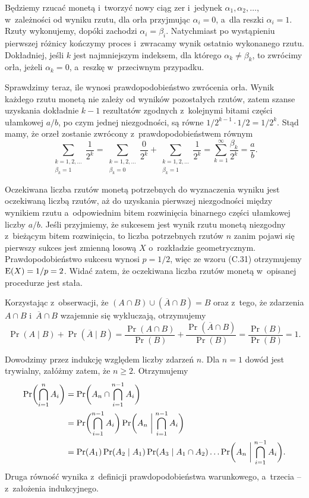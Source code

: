 Będziemy rzucać monetą i~tworzyć nowy ciąg zer i~jedynek $\alpha_1,\alpha_2,\dots$, w~zależności od wyniku  rzutu, dla orła przyjmując $\alpha_i=0$, a~dla reszki $\alpha_i=1$.
Rzuty wykonujemy, dopóki zachodzi $\alpha_i=\beta_i$.
Natychmiast po wystąpieniu pierwszej różnicy kończymy proces i~zwracamy wynik ostatnio wykonanego rzutu.
Dokładniej, jeśli $k$ jest najmniejszym indeksem, dla którego $\alpha_k\ne\beta_k$, to zwrócimy orła, jeżeli $\alpha_k=0$, a~reszkę w~przeciwnym przypadku.

Sprawdzimy teraz, ile wynosi prawdopodobieństwo zwrócenia orła.
Wynik każdego rzutu monetą nie zależy od wyników pozostałych rzutów, zatem szanse uzyskania dokładnie $k-1$ rezultatów zgodnych z~kolejnymi bitami części ułamkowej $a/b$, po czym jednej niezgodności, są równe $1/2^{k-1}\cdot1/2=1/2^k$.
Stąd mamy, że orzeł zostanie zwrócony z~prawdopodobieństwem równym
\[
    \sum_{\substack{k=1,2,\dots\\\beta_k=1}}\!\frac{1}{2^k} = \sum_{\substack{k=1,2,\dots\\\beta_k=0}}\!\frac{0}{2^k}+\sum_{\substack{k=1,2,\dots\\\beta_k=1}}\!\frac{1}{2^k} = \sum_{k=1}^\infty\frac{\beta_k}{2^k} = \frac{a}{b}.
\]

Oczekiwana liczba rzutów monetą potrzebnych do wyznaczenia wyniku jest oczekiwaną liczbą rzutów, aż do uzyskania pierwszej niezgodności między wynikiem rzutu a~odpowiednim bitem rozwinięcia binarnego części ułamkowej liczby $a/b$.
Jeśli przyjmiemy, że sukcesem jest wynik rzutu monetą niezgodny z~bieżącym bitem rozwinięcia, to liczba potrzebnych rzutów $n$ zanim pojawi się pierwszy sukces jest zmienną losową $X$ o~rozkładzie geometrycznym.
Prawdopodobieństwo sukcesu wynosi $p=1/2$, więc ze wzoru (C.31) otrzymujemy $\operatorname{E}(X)=1/p=2$.
Widać zatem, że oczekiwana liczba rzutów monetą w~opisanej procedurze jest stała.

\exercise %
Korzystając z~obserwacji, że $(A\cap B)\cup(\overline{A}\cap B)=B$ oraz z~tego, że zdarzenia $A\cap B$ i~$\overline{A}\cap B$ wzajemnie się wykluczają, otrzymujemy
\[
	\Pr(A\mid B)+\Pr(\overline{A}\mid B) = \frac{\Pr(A\cap B)}{\Pr(B)}+\frac{\Pr(\overline{A}\cap B)}{\Pr(B)} = \frac{\Pr(B)}{\Pr(B)} = 1.
\]

\exercise %
Dowodzimy przez indukcję względem liczby zdarzeń $n$.
Dla $n=1$ dowód jest trywialny, załóżmy zatem, że $n\ge2$.
Otrzymujemy
\begin{align*}
	\Pr\biggl(\bigcap_{i=1}^nA_i\biggr) &= \Pr\biggl(A_n\cap\bigcap_{i=1}^{n-1}A_i\biggr) \\
	&= \Pr\biggl(\bigcap_{i=1}^{n-1}A_i\biggr)\Pr\biggl(A_n\biggm|\bigcap_{i=1}^{n-1}A_i\biggr) \\
	&= \Pr(A_1)\Pr(A_2\mid A_1)\Pr(A_3\mid A_1\cap A_2)\dots\Pr\biggl(A_n\biggm|\bigcap_{i=1}^{n-1}A_i\biggr).
\end{align*}
Druga równość wynika z~definicji prawdopodobieństwa warunkowego, a~trzecia -- z~założenia indukcyjnego.


